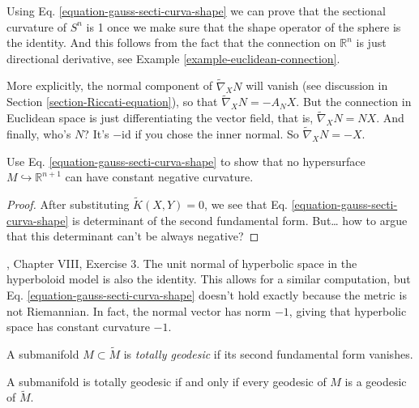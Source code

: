 \documentclass{book}
\begin{document}
\begin{example}
\label{example-sectional-curvature-of-sphere}
Using Eq.
\ref{equation-gauss-secti-curva-shape} we can
prove that the sectional
curvature of $S^n$ is 1 once we make sure
that the shape operator of the sphere
is the identity. And this follows from the
fact that the connection on
$\mathbb{R}^n$ is just directional
derivative, see Example
\ref{example-euclidean-connection}.

More explicitly, the normal component of
$\tilde{\nabla}_X N$ will vanish (see
discussion in Section
\ref{section-Riccati-equation}), so that
$\tilde{\nabla}_XN=-A_N X$. But the
connection in Euclidean space is just
differentiating the vector field, that is,
$\tilde{\nabla}_X N=N X$. And
finally, who's $N$? It's $-\text{id}$ if you
chose the inner normal. So
 $\tilde{\nabla}_X N=-X$.
\end{example}

\begin{exercise}
\label{exercise-Gauss-sectional}
Use Eq.
\ref{equation-gauss-secti-curva-shape}
to show that no
hypersurface $M \hookrightarrow
\mathbb{R}^{n+1}$ can have constant negative
curvature.
\end{exercise}

\begin{proof}
After substituting $\tilde{K}(X,Y)=0$, we see
that Eq.
\ref{equation-gauss-secti-curva-shape} is
determinant of the second fundamental form.
 But… how to argue that this determinant
 can't be always negative?
\end{proof}

\begin{example}
\label{example-hyperbolic-space}
\cite{doc}, Chapter VIII, Exercise 3. The
unit normal of hyperbolic space in the
hyperboloid model is also the identity. This
allows for a similar computation,
but Eq.
\ref{equation-gauss-secti-curva-shape}
doesn't hold
exactly because the
metric is not Riemannian. In fact, the normal
vector has norm $-1$, giving that
hyperbolic space has constant curvature $-1$.
\end{example}

\begin{definition}
\label{definition-total-geode-subma}
A submanifold $M\subset\tilde{M}$ is {\it
totally geodesic} if its second
fundamental form vanishes.
\end{definition}

\begin{lemma}
\label{lemma-totally-geodesic-submanifold}
A submanifold is totally geodesic if and only
if every geodesic of $M$ is a
geodesic of $\tilde{M}$.
\end{lemma}
\end{document}
